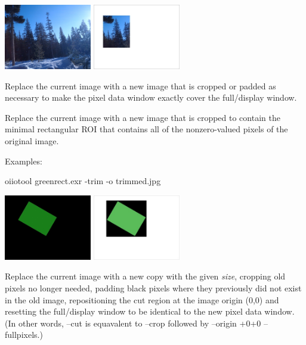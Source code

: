 \hspace{0.4in} \includegraphics[width=1.5in]{figures/tahoe-small.jpg}
\raisebox{40pt}{\large $\rightarrow$}
 \includegraphics[width=1.5in]{figures/crop.jpg}
\apiend

Replace the current image with a new image that is cropped or padded
as necessary to make the pixel data window exactly cover
the full/display window.
\apiend

Replace the current image with a new image that is cropped to contain the
minimal rectangular ROI that contains all of the nonzero-valued pixels of
the original image.

\noindent Examples:

\begin{code}
    oiiotool greenrect.exr -trim -o trimmed.jpg
\end{code}
\hspace{0.4in} \includegraphics[width=1.5in]{figures/pretrim.jpg}
\raisebox{40pt}{\large $\rightarrow$}
 \includegraphics[width=1.5in]{figures/trim.jpg}
\apiend

Replace the current image with a new copy with the given \emph{size},
cropping old pixels no longer needed, padding black pixels where they
previously did not exist in the old image, repositioning the cut region
at the image origin (0,0) and resetting the full/display window to be
identical to the new pixel data window.  (In other words, {\cf --cut}
is equavalent to {\cf --crop} followed by {\cf --origin +0+0 --fullpixels}.)

